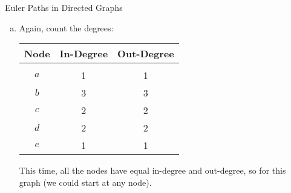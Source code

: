 \begin{example}{Euler Paths in Directed Graphs}
\begin{enumerate}[(a)]
\item Again, count the degrees:
\begin{center}
\begin{tabular}{c c c}
\textbf{Node} & \textbf{In-Degree} & \textbf{Out-Degree}\\
\hline
 & & \\
$a$ & 1 & 1\\
$b$ & 3 & 3\\
$c$ & 2 & 2\\
$d$ & 2 & 2\\
$e$ & 1 & 1
\end{tabular}
\end{center}
This time, all the nodes have equal in-degree and out-degree, so  for this graph (we could start at any node).
\end{enumerate}
\end{example}
\vfill
\pagebreak

\def\icosianpuzzlesidenote{\marginnote{Although William Rowan Hamilton was not the first one to study these paths, they are named for him because he invented a puzzle called the Icosian game, which starts with a 12-sided \emph{dodecahedron}:
\begin{center}
\texttt{[image: dodecahedron]}
\end{center}
The goal is to find a Hamilton circuit, traveling along the edges and touching each corner exactly once.  Hamilton sold this puzzle to a game dealer, and it was marketed throughout Europe.  In the most popular form, the dodecahedron was modeled as a planar graph, like this one:
\begin{center}
\begin{tikzpicture}[scale=0.5]
  \GraphInit[vstyle=simple]
  \tikzset{VertexStyle/.append style={scale=0.3}}
  \grEmptyCycle[prefix=a,RA=3,rotation=18]{5}
  \grEmptyCycle[prefix=b,RA=2,rotation=18]{5}
  \grEmptyCycle[prefix=c,RA=1.3,rotation=198]{5}
  \grEmptyCycle[prefix=d,RA=0.7,rotation=198]{5}
  
  \Edge(a0)(a1)
  \Edge(a3)(a4)
  \Edge(d2)(d3)
  \Edge(d4)(d0)
  
  \Edge(a2)(b2)
  \Edge(c1)(d1)
  
  \Edge(b0)(c3)
  \Edge(b1)(c4)
  \Edge(b3)(c0)
  \Edge(b4)(c2)
  
  \SetUpEdge[style={color=red}]
  \Edge(a1)(a2)
  \Edge(a2)(a3)
  \Edge(a4)(a0)
  \Edge(d1)(d2)
  \Edge(d0)(d1)
  \Edge(d3)(d4)
  
  \Edge(a3)(b3)
  \Edge(b4)(c1)
  \Edge(a4)(b4)
  \Edge(a0)(b0)
  \Edge(c2)(d2)
  \Edge(c0)(d0)
  \Edge(c4)(d4)
  \Edge(c3)(d3)
  \Edge(a1)(b1)
  
  \Edge(b3)(c1)
  \Edge(b0)(c2)
  \Edge(b2)(c0)
  \Edge(b2)(c4)
  \Edge(b1)(c3)
\end{tikzpicture}
\end{center}

It was sold as a wooden board with pegs at the nodes of the graph, and players would wind a string along a path to solve it (one solution is shown in red).  %
}}

